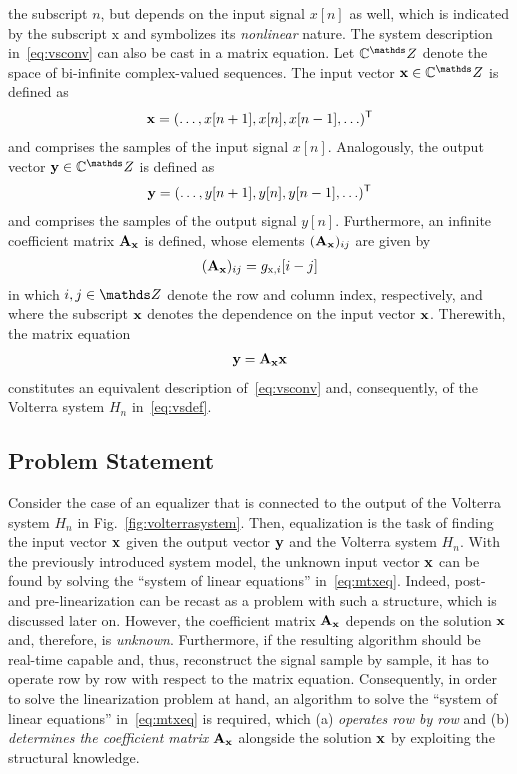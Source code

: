 \documentclass[10pt,twocolumn,twoside]{IEEEtran}
\begin{document}
the subscript $n$, but depends on the input signal $x[n]$ as well, which is indicated by
the subscript $\mathrm{x}$ and symbolizes its \emph{nonlinear} nature.
The system description in~\eqref{eq:vsconv} can also be
cast in a matrix equation. Let $\C^\Z$ denote the space of bi-infinite
complex-valued sequences. The input vector $\vm{x}\in\C^\Z$ is defined as
\begin{align}
	\bm{\mathrm{x}} = (\ldots, x[n+1], x[n], x[n-1], \ldots)^{\mathsf{T}}
	\label{eq:xvec}
\end{align}
and comprises the samples of the input signal $x[n]$.
Analogously, the output vector $\vm{y}\in\C^\Z$ is defined as
\begin{align}
	\bm{\mathrm{y}} = (\ldots, y[n+1], y[n], y[n-1], \ldots)^{\mathsf{T}}
	\label{eq:yvec}
\end{align}
and comprises the samples of the output signal $y[n]$. Furthermore, an infinite
coefficient matrix $\bm{\mathrm{A}}_{\bm{\mathrm{x}}}$ is defined,
whose elements $(\bm{\mathrm{A}}_{\bm{\mathrm{x}}})_{ij}$ are given by
\begin{align}
	(\bm{\mathrm{A}}_{\bm{\mathrm{x}}})_{ij} = g_{\mathrm{x},i}[i-j]
	\label{eq:axdef}
\end{align}
in which $i,j\in\Z$ denote the row and column index, respectively, and
where the subscript $\bm{\mathrm{x}}$ denotes the dependence on the input vector $\bm{\mathrm{x}}$.
Therewith, the matrix equation
\begin{align}
	\bm{\mathrm{y}} = \bm{\mathrm{A}}_{\bm{\mathrm{x}}}\bm{\mathrm{x}}
	\label{eq:mtxeq}
\end{align}
constitutes an equivalent description of~\eqref{eq:vsconv} and, consequently,
of the Volterra system $H_n$ in~\eqref{eq:vsdef}.

\subsection{Problem Statement}
	\label{model:problem}

Consider the case of an equalizer that is connected to the output of
the Volterra system $H_n$ in Fig.~\ref{fig:volterrasystem}.
Then, equalization is the task of finding the input vector $\bm{\mathrm{x}}$ given the
output vector $\bm{\mathrm{y}}$ and the Volterra system $H_n$. 
With the previously introduced system model, the unknown input vector
$\bm{\mathrm{x}}$ can be found by solving the ``system of linear equations'' in~\eqref{eq:mtxeq}.
Indeed, post- and pre-linearization can be recast
as a problem with such a structure, which is discussed later on.
However, the coefficient matrix $\bm{\mathrm{A}}_{\bm{\mathrm{x}}}$
depends on the solution $\bm{\mathrm{x}}$ and, therefore, is \emph{unknown}.
Furthermore, if the resulting algorithm should be real-time capable and, thus,
reconstruct the signal sample by sample, it has to operate row by row with
respect to the matrix equation. Consequently, in order to solve the linearization problem
at hand, an algorithm to solve the ``system of linear equations'' in~\eqref{eq:mtxeq}
is required, which (a) \emph{operates row by row} and
(b) \emph{determines the coefficient matrix} $\bm{\mathrm{A}}_{\bm{\mathrm{x}}}$ alongside
the solution $\bm{\mathrm{x}}$ by exploiting the structural knowledge.
\end{document}
